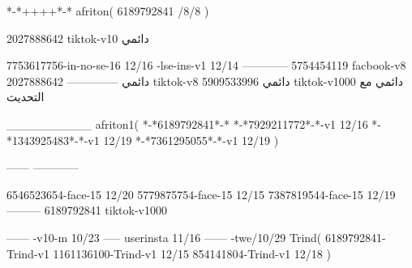 *-*++++*-*
afriton(
6189792841 /8/8
)

2027888642 tiktok-v10
دائمي

7753617756-in-no-se-16 12/16
-lse-ins-v1 12/14
------------
5754454119 facbook-v8
دائمي
--------------
2027888642 tiktok-v8
دائمي
5909533996 tiktok-v1000
دائمي مع التحديث

__________
afriton1(
*-*6189792841*-*
*-*7929211772*-*-v1 12/16
*-*1343925483*-*-v1 12/19
*-*7361295055*-*-v1 12/19
)

------
------------


6546523654-face-15 12/20
5779875754-face-15 12/15
7387819544-face-15 12/19
---------
6189792841 tiktok-v1000
 
------
-v10-m 10/23
-----
userinsta 11/16
------
-twe/10/29
Trind(
6189792841-Trind-v1 
1161136100-Trind-v1 12/15
854141804-Trind-v1 12/18
)
